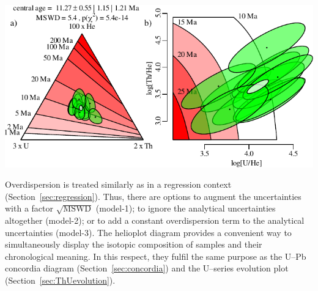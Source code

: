 \begin{refsection}
\noindent\begin{minipage}[t]{.7\linewidth}
\strut\vspace*{-\baselineskip}\newline
\includegraphics[width=\textwidth]{../figures/helioplot.pdf}\\
\end{minipage}
\begin{minipage}[t]{.3\linewidth}
  \label{fig:UThHeIsochronHelioplot}
\end{minipage}

Overdispersion is treated similarly as in a regression context
(Section~\ref{sec:regression}).  Thus, there are options to augment
the uncertainties with a factor $\sqrt{\mbox{MSWD}}$ (model-1); to
ignore the analytical uncertainties altogether (model-2); or to add a
constant overdispersion term to the analytical uncertainties
(model-3).  The helioplot diagram provides a convenient way to
simultaneously display the isotopic composition of samples and their
chronological meaning. In this respect, they fulfil the same purpose
as the U--Pb concordia diagram (Section~\ref{sec:concordia}) and the
U--series evolution plot (Section~\ref{sec:ThUevolution}).

\printbibliography[heading=subbibliography]

\end{refsection}
